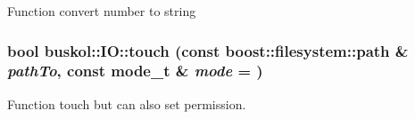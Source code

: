 \label{group__libbuskol_ga0b261d6de4c26434d56ba40d00daa68a}
Function convert number to string \hypertarget{group__libbuskol_ga5fb8ee7fb3a7ecec3502af64538cfc3c}{
\subsubsection[{touch}]{\setlength{\rightskip}{0pt plus 5cm}bool buskol::IO::touch (const boost::filesystem::path \& {\em pathTo}, \/  const mode\_\-t \& {\em mode} = {})}}
\label{group__libbuskol_ga5fb8ee7fb3a7ecec3502af64538cfc3c}
Function touch but can also set permission. 
